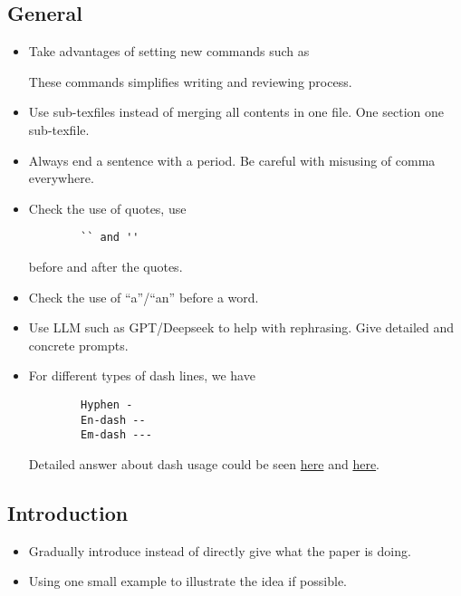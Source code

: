 \documentclass[acmsmall,screen,review]{acmart}
\begin{document}
\subsection{General}
\begin{itemize}
    \item Take advantages of setting new commands such as
\begin{spverbatim}
\newcommand{\Issue}[1]{\textcolor{red}{[\textbf{Discussion needed}: #1]}}
\newcommand{\TODO}[1]{\textcolor{blue}{[\textbf{TODO @Jingren}: #1]}}
\end{spverbatim}
These commands simplifies writing and reviewing process.
    \item Use sub-texfiles instead of merging all contents in one file. One section one sub-texfile.
    \item Always end a sentence with a period. Be careful with misusing of comma everywhere.
    \item Check the use of quotes, use
    \begin{verbatim}
        `` and ''
    \end{verbatim}
    \vspace{-\baselineskip}
    before and after the quotes.
    \item Check the use of ``a''/``an'' before a word.
    \item Use LLM such as GPT/Deepseek to help with rephrasing. Give detailed and concrete prompts.
    \item For different types of dash lines, we have
    \begin{verbatim}
        Hyphen -
        En-dash --
        Em-dash ---
    \end{verbatim}
    \vspace{-\baselineskip}
    Detailed answer about dash usage could be seen \href{https://tex.stackexchange.com/questions/53413/what-is-the-latex-command-for-em-dash}{here} and \href{https://www.reddit.com/r/writing/comments/vysrhj/comment/ig41u4x/?utm_source=share&utm_medium=web3x&utm_name=web3xcss&utm_term=1&utm_content=share_button}{here}.

\end{itemize}
\subsection{Introduction}
\begin{itemize}
    \item Gradually introduce instead of directly give what the paper is doing.
    \item Using one small example to illustrate the idea if possible.
\end{itemize}
\end{document}

